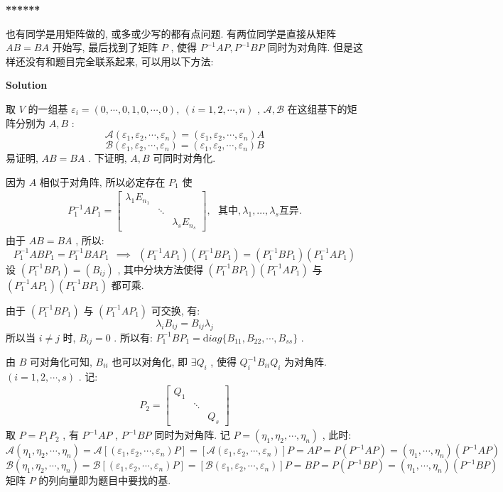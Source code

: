 \documentclass[11pt,a4paper,openany,oneside]{book}
\newcommand{\diag}{\mathrm diag}
\newcommand\Solution{\noindent\textbf{\textsf{Solution}}\par\medskip}
\begin{document}
\begin{myexample}
	\textbf{******}

也有同学是用矩阵做的, 或多或少写的都有点问题. 有两位同学是直接从矩阵 $ AB = BA $ 开始写, 最后找到了矩阵 $ P $ , 使得 $ P^{-1}AP, P^{-1}BP $ 同时为对角阵. 但是这样还没有和题目完全联系起来, 可以用以下方法: \\ 

\end{myexample}
\Solution

取 $ V $ 的一组基 $ \varepsilon_i = (0, \cdots, 0, 1, 0, \cdots, 0), \ (i=1, 2, \cdots, n) $ ,  $ \mathcal{A}, \mathcal{B} $ 在这组基下的矩阵分别为 $ A, B $ :
 $$  \mathcal{A}(\varepsilon_1, \varepsilon_2, \cdots, \varepsilon_n) = (\varepsilon_1, \varepsilon_2, \cdots, \varepsilon_n)A  $$ 
 $$  \mathcal{B}(\varepsilon_1, \varepsilon_2, \cdots, \varepsilon_n) = (\varepsilon_1, \varepsilon_2, \cdots, \varepsilon_n)B  $$ 
易证明,  $ AB = BA $ . 下证明,  $ A, B $ 可同时对角化.

因为 $ A $ 相似于对角阵, 所以必定存在 $ P_1 $ 使
\begin{gather*}
P_1^{-1}AP_1 = 
\begin{bmatrix}
\lambda_1E_{n_1}  &         &          \\
&  \ddots &          \\
&         &  \lambda_sE_{n_s}
\end{bmatrix}, \ \ \ \text{其中}, \lambda_1, \dots, \lambda_s \text{互异}.
\end{gather*}
由于 $ AB = BA $ , 所以:
 $$  P_1^{-1}ABP_1 = P_1^{-1}BAP_1 \ \ \implies \ \ (P_1^{-1}AP_1)(P_1^{-1}BP_1) = (P_1^{-1}BP_1)(P_1^{-1}AP_1)   $$ 
设 $ (P_1^{-1}BP_1) = (B_{ij}) $ , 其中分块方法使得 $ (P_1^{-1}BP_1)(P_1^{-1}AP_1) $ 与 $ (P_1^{-1}AP_1)(P_1^{-1}BP_1) $ 都可乘.

由于 $ (P_1^{-1}BP_1) $ 与 $ (P_1^{-1}AP_1) $ 可交换, 有:
 $$  \lambda_iB_{ij} = B_{ij}\lambda_j  $$ 
所以当 $ i \neq j $ 时,  $ B_{ij} = 0 $ . 所以有:  $ P_1^{-1}BP_1 = \diag\{ B_{11}, B_{22}, \cdots, B_{ss} \} $ .

由 $ B $ 可对角化可知,  $ B_{ii} $ 也可以对角化, 即 $ \exists Q_i $ , 使得 $ Q_i^{-1}B_{ii}Q_i $ 为对角阵. $ (i=1, 2, \cdots, s) $ . 记:
\begin{gather*}
P_2 = 
\begin{bmatrix}
Q_1  &      &       \\
&  \ddots  &    \\
&              & Q_s 
\end{bmatrix}
\end{gather*}
取 $ P = P_1P_2 $ , 有 $ P^{-1}AP $ ,  $ P^{-1}BP $ 同时为对角阵. 记 $ P=(\eta_1, \eta_2, \cdots, \eta_n) $ , 此时:
 $$  \mathcal{A}(\eta_1, \eta_2, \cdots, \eta_n) = \mathcal{A}[(\varepsilon_1, \varepsilon_2, \cdots, \varepsilon_n)P] = [\mathcal{A}(\varepsilon_1, \varepsilon_2, \cdots, \varepsilon_n)]P = AP = P(P^{-1}AP)=(\eta_1, \cdots, \eta_n)(P^{-1}AP)  $$ 
 $$  \mathcal{B}(\eta_1, \eta_2, \cdots, \eta_n) = \mathcal{B}[(\varepsilon_1, \varepsilon_2, \cdots, \varepsilon_n)P] = [\mathcal{B}(\varepsilon_1, \varepsilon_2, \cdots, \varepsilon_n)]P = BP =P(P^{-1}BP)= (\eta_1, \cdots, \eta_n)(P^{-1}BP)  $$ 
矩阵 $ P $ 的列向量即为题目中要找的基.
\end{document}
